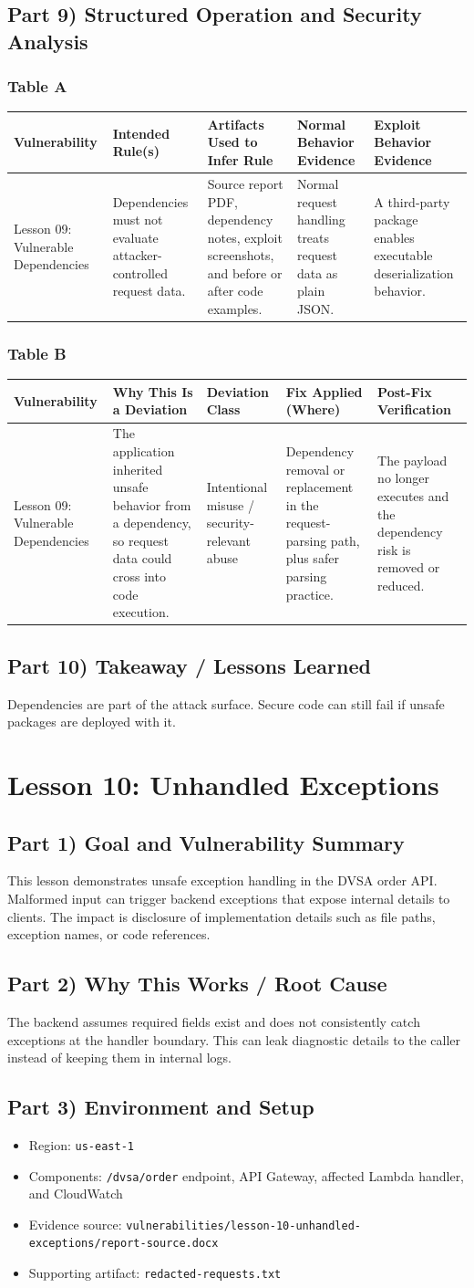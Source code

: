 \documentclass[12pt]{article}
\makeatletter
\newcommand{\analysistables}[9]{
\subsubsection*{Table A}
{\footnotesize
\begin{longtable}{@{}p{0.13\textwidth}p{0.18\textwidth}p{0.17\textwidth}p{0.16\textwidth}p{0.16\textwidth}@{}}
\toprule
Vulnerability & Intended Rule(s) & Artifacts Used to Infer Rule & Normal Behavior Evidence & Exploit Behavior Evidence \\
\midrule
#1 & #2 & #3 & #4 & #5 \\
\bottomrule
\end{longtable}
}

\subsubsection*{Table B}
{\footnotesize
\begin{longtable}{@{}p{0.13\textwidth}p{0.18\textwidth}p{0.13\textwidth}p{0.18\textwidth}p{0.16\textwidth}@{}}
\toprule
Vulnerability & Why This Is a Deviation & Deviation Class & Fix Applied (Where) & Post-Fix Verification \\
\midrule
#1 & #6 & #7 & #8 & #9 \\
\bottomrule
\end{longtable}
}
}
\makeatother
\begin{document}
\subsection*{Part 9) Structured Operation and Security Analysis}
\analysistables
{Lesson 09: Vulnerable Dependencies}
{Dependencies must not evaluate attacker-controlled request data.}
{Source report PDF, dependency notes, exploit screenshots, and before or after code examples.}
{Normal request handling treats request data as plain JSON.}
{A third-party package enables executable deserialization behavior.}
{The application inherited unsafe behavior from a dependency, so request data could cross into code execution.}
{Intentional misuse / security-relevant abuse}
{Dependency removal or replacement in the request-parsing path, plus safer parsing practice.}
{The payload no longer executes and the dependency risk is removed or reduced.}

\subsection*{Part 10) Takeaway / Lessons Learned}
Dependencies are part of the attack surface. Secure code can still fail if unsafe packages are deployed with it.

\clearpage
\section{Lesson 10: Unhandled Exceptions}

\subsection*{Part 1) Goal and Vulnerability Summary}
This lesson demonstrates unsafe exception handling in the DVSA order API. Malformed input can trigger backend exceptions that expose internal details to clients. The impact is disclosure of implementation details such as file paths, exception names, or code references.

\subsection*{Part 2) Why This Works / Root Cause}
The backend assumes required fields exist and does not consistently catch exceptions at the handler boundary. This can leak diagnostic details to the caller instead of keeping them in internal logs.

\subsection*{Part 3) Environment and Setup}
\begin{itemize}
\item Region: \texttt{us-east-1}
\item Components: \texttt{/dvsa/order} endpoint, API Gateway, affected Lambda handler, and CloudWatch
\item Evidence source: \texttt{vulnerabilities/lesson-10-unhandled-exceptions/report-source.docx}
\item Supporting artifact: \texttt{redacted-requests.txt}
\end{itemize}
\end{document}
